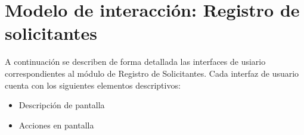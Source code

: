 
\chapter{Modelo de interacción: Registro de solicitantes}

	A continuación se describen de forma detallada las interfaces de usiario correspondientes al módulo de Registro de Solicitantes. Cada interfaz de usuario cuenta con los siguientes elementos descriptivos:

	\begin{itemize}

		\item Descripción de pantalla

		\item Acciones en pantalla

	\end{itemize}

	


